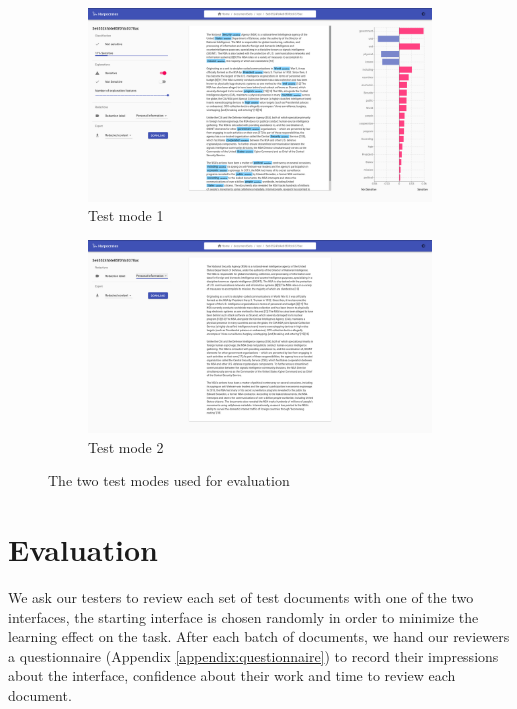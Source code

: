 \documentclass{l4proj}
\begin{document}
\begin{figure}[H]
    \centering
    \begin{subfigure}[c]{0.49\textwidth}
        \centering
        \includegraphics[width=\textwidth]{images/ui_test_mode_1.png}
        \caption{Test mode 1}
        \label{fig:test-mode-1}
    \end{subfigure}
    \begin{subfigure}[c]{0.49\textwidth}
        \centering
        \includegraphics[width=\textwidth]{images/ui_test_mode_2.png}
        \caption{Test mode 2}
        \label{fig:test-mode-2}
    \end{subfigure}
    \caption{The two test modes used for evaluation}
    \label{fig:test-modes}
\end{figure}


\section{Evaluation}

We ask our testers to review each set of test documents with one of the two interfaces, the starting interface is chosen randomly in order to minimize the learning effect on the task.
After each batch of documents, we hand our reviewers a questionnaire (Appendix \ref{appendix:questionnaire}) to record their impressions about the interface, confidence about their work and time to review each document.
\end{document}
